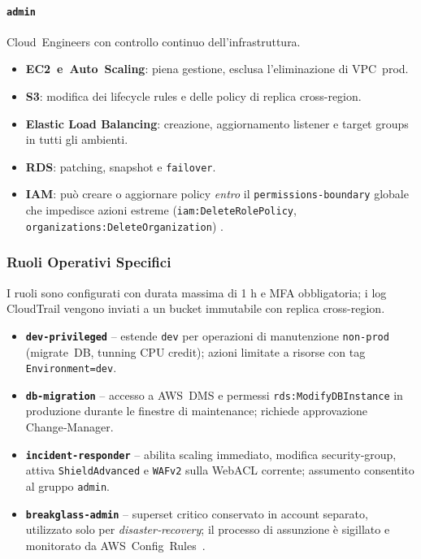 \paragraph{\texttt{admin}}%
Cloud Engineers con controllo continuo dell'infrastruttura.  
\begin{itemize}
  \item \textbf{EC2 e Auto Scaling}: piena gestione, esclusa l'eliminazione di VPC prod.  
  \item \textbf{S3}: modifica dei lifecycle rules e delle policy di replica cross-region.
  
  \item \textbf{Elastic Load Balancing}: creazione, aggiornamento listener e target groups in tutti gli ambienti.
  
  \item \textbf{RDS}: patching, snapshot e \texttt{failover}.
  
  \item \textbf{IAM}: può creare o aggiornare policy \emph{entro} il \texttt{permissions-boundary} globale che impedisce azioni estreme (\texttt{iam:DeleteRolePolicy}, \texttt{organizations:DeleteOrganization}) \cite{AWSPermBoundaries}.
\end{itemize}

\subsubsection{Ruoli Operativi Specifici}
\label{subsubsec:ruoli_specifici}

I ruoli sono configurati con durata massima di 1 h e MFA obbligatoria;
i log CloudTrail vengono inviati a un bucket immutabile con
replica cross-region.

\begin{itemize}
  \item \textbf{\texttt{dev‑privileged}} – estende \texttt{dev} per operazioni
        di manutenzione \texttt{non‑prod} (migrate DB, tunning CPU credit);
        azioni limitate a risorse con tag \texttt{Environment=dev}.  
  \item \textbf{\texttt{db‑migration}} – accesso a AWS DMS e permessi
        \texttt{rds:ModifyDBInstance} in produzione durante le finestre di
        maintenance; richiede approvazione Change‑Manager.  
  \item \textbf{\texttt{incident‑responder}} – abilita scaling immediato,
        modifica security‑group, attiva \texttt{ShieldAdvanced} e
        \texttt{WAFv2} sulla WebACL corrente; assumento consentito al gruppo
        \texttt{admin}.  
  \item \textbf{\texttt{breakglass‑admin}} – superset critico conservato in
        account separato, utilizzato solo per \emph{disaster‑recovery}; il
        processo di assunzione è sigillato e monitorato da AWS Config Rules \cite{AWSSTS}.  
\end{itemize}

